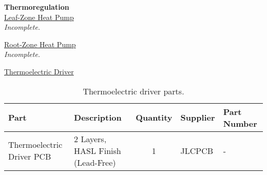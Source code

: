 \clearpage

\textbf{Thermoregulation}\\
\uline{Leaf-Zone Heat Pump}\\
\textit{Incomplete.}

\uline{Root-Zone Heat Pump}\\
\textit{Incomplete.}

\uline{Thermoelectric Driver}
\begin{table}[!ht]
    \centering
    \begin{tabular}{|l|l|c|l|l|}
    \hline
        Part                        & Description                       & Quantity  & Supplier  & Part Number  \\ \hline
        Thermoelectric Driver PCB   & 2 Layers, HASL Finish (Lead-Free) & 1         & JLCPCB    & -                     \\ \hline
    \end{tabular}
    \caption{Thermoelectric driver parts.}
    \label{tab:automation_parts}
\end{table}


